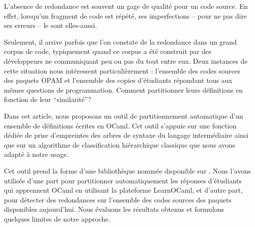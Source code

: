 L'absence de redondance est souvent un gage de qualité pour un code
source. En effet, lorsqu'un fragment de code est répété, ses
imperfections -- pour ne pas dire ses erreurs -- le sont elles-aussi.

Seulement, il arrive parfois que l'on constate de la redondance dans
un grand corpus de code, typiquement quand ce corpus a été construit
par des développeurs ne communiquant peu ou pas du tout entre
eux. Deux instances de cette situation nous intéressent
particulièrement : l'ensemble des codes sources des paquets OPAM et
l'ensemble des copies d'étudiants répondant tous aux mêmes questions
de programmation. Comment partitionner leurs définitions en fonction
de leur ``similarité''?

Dans cet article, nous proposons un outil de partitionnement
automatique d'un ensemble de définitions écrites en OCaml. Cet outil
s'appuie sur une fonction dédiée de prise d'empreintes des arbres de
syntaxe du langage intermédiaire {\LambdaCode} ainsi que sur un
algorithme de classification hiérarchique classique que nous avons
adapté à notre usage.

Cet outil prend la forme d'une bibliothèque nommée {\Asak} disponible
sur {\Opam}. Nous l'avons utilisée d'une part pour partitionner
automatiquement les réponses d'étudiants qui apprennent OCaml en
utilisant la plateforme LearnOCaml, et d'autre part, pour détecter des
redondances sur l'ensemble des codes sources des paquets~{\Opam}
disponibles aujourd'hui. Nous évaluons les résultats obtenus et
formulons quelques limites de notre approche.
